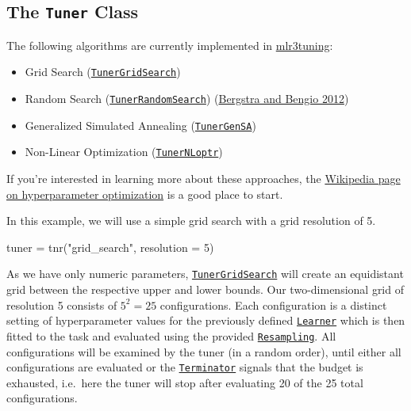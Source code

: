 \documentclass[
]{scrbook}
\newenvironment{Shaded}{\begin{snugshade}}{\end{snugshade}}
\newcommand{\AttributeTok}[1]{\textcolor[rgb]{0.77,0.63,0.00}{#1}}
\newcommand{\DecValTok}[1]{\textcolor[rgb]{0.00,0.00,0.81}{#1}}
\newcommand{\FunctionTok}[1]{\textcolor[rgb]{0.00,0.00,0.00}{#1}}
\newcommand{\NormalTok}[1]{#1}
\newcommand{\OtherTok}[1]{\textcolor[rgb]{0.56,0.35,0.01}{#1}}
\newcommand{\StringTok}[1]{\textcolor[rgb]{0.31,0.60,0.02}{#1}}
\providecommand{\tightlist}{%
  \setlength{\itemsep}{0pt}\setlength{\parskip}{0pt}}
\renewenvironment{Shaded} {\begin{snugshade}\small} {\end{snugshade}}
\begin{document}
\hypertarget{tuning-algorithms}{%
\subsection{\texorpdfstring{The \texttt{Tuner} Class}{The Tuner Class}}\label{tuning-algorithms}}

The following algorithms are currently implemented in \href{https://mlr3tuning.mlr-org.com}{mlr3tuning}:

\begin{itemize}
\tightlist
\item
  Grid Search (\href{https://mlr3tuning.mlr-org.com/reference/mlr_tuners_grid_search.html}{\texttt{TunerGridSearch}})
\item
  Random Search (\href{https://mlr3tuning.mlr-org.com/reference/mlr_tuners_random_search.html}{\texttt{TunerRandomSearch}}) (\protect\hyperlink{ref-bergstra2012}{Bergstra and Bengio 2012})
\item
  Generalized Simulated Annealing (\href{https://mlr3tuning.mlr-org.com/reference/mlr_tuners_gensa.html}{\texttt{TunerGenSA}})
\item
  Non-Linear Optimization (\href{https://mlr3tuning.mlr-org.com/reference/mlr_tuners_nloptr.html}{\texttt{TunerNLoptr}})
\end{itemize}

If you're interested in learning more about these approaches, the \href{Hyperparameter_optimization}{Wikipedia page on hyperparameter optimization} is a good place to start.

In this example, we will use a simple grid search with a grid resolution of 5.

\begin{Shaded}
\begin{Highlighting}[]
\NormalTok{tuner }\OtherTok{=} \FunctionTok{tnr}\NormalTok{(}\StringTok{"grid\_search"}\NormalTok{, }\AttributeTok{resolution =} \DecValTok{5}\NormalTok{)}
\end{Highlighting}
\end{Shaded}

As we have only numeric parameters, \href{https://mlr3tuning.mlr-org.com/reference/mlr_tuners_grid_search.html}{\texttt{TunerGridSearch}} will create an equidistant grid between the respective upper and lower bounds.
Our two-dimensional grid of resolution 5 consists of \(5^2 = 25\) configurations.
Each configuration is a distinct setting of hyperparameter values for the previously defined \href{https://mlr3.mlr-org.com/reference/Learner.html}{\texttt{Learner}} which is then fitted to the task and evaluated using the provided \href{https://mlr3.mlr-org.com/reference/Resampling.html}{\texttt{Resampling}}.
All configurations will be examined by the tuner (in a random order), until either all configurations are evaluated or the \href{https://bbotk.mlr-org.com/reference/Terminator.html}{\texttt{Terminator}} signals that the budget is exhausted, i.e.~here the tuner will stop after evaluating 20 of the 25 total configurations.
\end{document}
